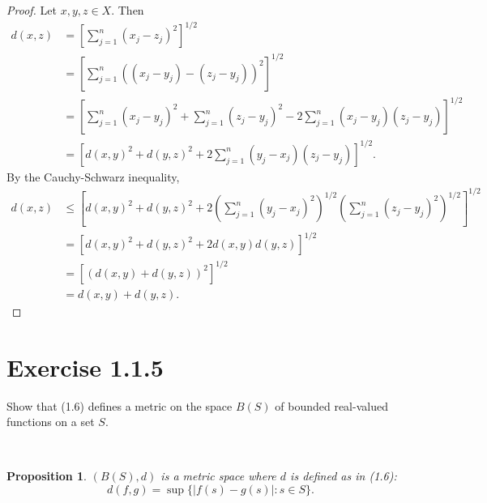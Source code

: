 \documentclass[12pt]{article}
\newenvironment{problem}
    {\begin{lrbox}{\mybox}\begin{minipage}{\textwidth-10pt}}
    {\end{minipage}\end{lrbox}\framebox[6.5in]{\usebox{\mybox}}\\}
\newtheorem{proposition}{Proposition}
\begin{document}
\begin{proof}
    Let $x,y,z\in X$. Then
    \begin{align*}
        d(x,z)
            &= \left[\sum_{j=1}^n(x_j-z_j)^2\right]^{1/2} \\
            &= \left[\sum_{j=1}^n((x_j-y_j)-(z_j-y_j))^2\right]^{1/2} \\
            &= \left[\sum_{j=1}^n(x_j-y_j)^2 + \sum_{j=1}^n(z_j-y_j)^2 - 2\sum_{j=1}^n(x_j-y_j)(z_j-y_j)\right]^{1/2} \\
            &= \left[d(x,y)^2 + d(y,z)^2 + 2\sum_{j=1}^n(y_j-x_j)(z_j-y_j)\right]^{1/2}.
    \end{align*}
    By the Cauchy-Schwarz inequality,
    \begin{align*}
        d(x,z)
            &\leq \left[d(x,y)^2 + d(y,z)^2 + 2\left(\sum_{j=1}^n(y_j-x_j)^2\right)^{1/2}\left(\sum_{j=1}^n(z_j-y_j)^2\right)^{1/2}\right]^{1/2} \\
            &= \left[d(x,y)^2 + d(y,z)^2 + 2d(x,y)d(y,z)\right]^{1/2} \\
            &= \left[(d(x,y) + d(y,z))^2\right]^{1/2} \\
            &= d(x,y) + d(y,z).
    \end{align*}
    
\end{proof}

\newpage
\section*{Exercise 1.1.5}
\begin{problem}
    Show that (1.6) defines a metric on the space $B(S)$ of bounded real-valued functions on a set $S$.
\end{problem}

\begin{proposition}
    $(B(S), d)$ is a metric space where $d$ is defined as in (1.6):
    \[d(f,g) = \sup\{|f(s)-g(s)| : s\in S\}.\]
\end{proposition}
\end{document}
